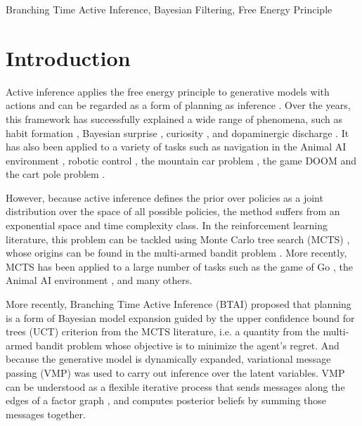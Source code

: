 \documentclass[twoside,11pt]{article}
\begin{document}
\begin{keywords}
Branching Time Active Inference, Bayesian Filtering, Free Energy Principle
\end{keywords}

\section{Introduction}

Active inference applies the free energy principle to generative models with actions \citep{FRISTON2016862,AI_TUTO,AI_VMP} and can be regarded as a form of planning as inference \citep{PAI}. Over the years, this framework has successfully explained a wide range of phenomena, such as habit formation \citep{FRISTON2016862}, Bayesian surprise \citep{bayes_surprise}, curiosity \citep{curiosity}, and dopaminergic discharge \citep{dopamine}. It has also been applied to a variety of tasks such as navigation in the Animal AI environment \citep{DeepAIwithMCMC}, robotic control \citep{pezzato2020active,sancaktar2020endtoend}, the mountain car problem \citep{catal2020learning}, the  game DOOM \citep{CULLEN2018809} and the cart pole problem \citep{cart_pole}.

However, because active inference defines the prior over policies as a joint distribution over the space of all possible policies, the method suffers from an exponential space and time complexity class. In the reinforcement learning literature, this problem can be tackled using Monte Carlo tree search (MCTS) \citep{6145622}, whose origins can be found in the multi-armed bandit problem \citep{Auer2002}. More recently, MCTS has been applied to a large number of tasks such as the game of Go \citep{Go}, the Animal AI environment \citep{DeepAIwithMCMC}, and many others.

More recently, Branching Time Active Inference (BTAI) \citep{AITS_THEORY,AITS_PRACTICE} proposed that planning is a form of Bayesian model expansion guided by the upper confidence bound for trees (UCT) criterion from the MCTS literature, i.e. a quantity from the multi-armed bandit problem whose objective is to minimize the agent's regret. And because the generative model is dynamically expanded, variational message passing (VMP) \citep{VMP_TUTO} was used to carry out inference over the latent variables. VMP can be understood as a flexible iterative process that sends messages along the edges of a factor graph \citep{FFG_TUTO}, and computes posterior beliefs by summing those messages together.
\end{document}
